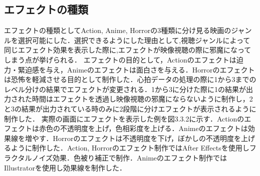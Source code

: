 \subsection{エフェクトの種類}
エフェクトの種類としてAction, Anime, Horrorの3種類に分け見る映画のジャンルを選択可能にした．選択できるようにした理由として,視聴ジャンルによって同じエフェクト効果を表示した際に,エフェクトが映像視聴の際に邪魔になってしまう点が挙げられる．
エフェクトの目的として，Actionのエフェクトは迫力・緊迫感を与え，Animeのエフェクトは面白さを与える．Horrorのエフェクトは恐怖を軽減させる目的として制作した．心拍データの処理の際に1から3までのレベル分けの結果でエフェクトが変更される．1から3に分けた際に1の結果が出力された時間はエフェクトを透過し映像視聴の邪魔にならないように制作し，2と3の結果が出力されている時のみに2段階に分けエフェクトが表示されるように制作した．
実際の画面にエフェクトを表示した例を図3.3.2に示す．Actionのエフェクトは赤色の不透明度を上げ，色相彩度を上げる．Animeのエフェクトは効果線を増やす．Horrorのエフェクトは不透明度を下げ，ぼかしの不透明度を上げるように制作した．Action, Horrorのエフェクト制作ではAfter Effectsを使用しフラクタルノイズ効果．色被り補正で制作．Animeのエフェクト制作ではIllustratorを使用し効果線を制作した．


